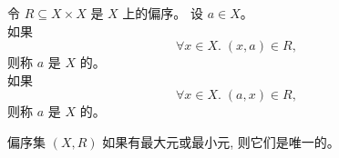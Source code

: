 \begin{frame}{}
  \begin{definition}
    令 $R \subseteq X \times X$ 是 $X$ 上的偏序。
    设 $a \in X$。\\[5pt]

    \pause
    如果
    \[
      \forall x \in X.\; (x, a) \in R,
    \]
    则称 $a$ 是 $X$ 的。\\[10pt]

    \pause
    如果
    \[
      \forall x \in X.\; (a, x) \in R,
    \]
    则称 $a$ 是 $X$ 的。
  \end{definition}

  \pause
  \begin{center}
  \end{center}
\end{frame}

\begin{frame}{}
  \begin{theorem}
    偏序集 $(X, R)$ 如果有最大元或最小元, 则它们是唯一的。
  \end{theorem}
\end{frame}

\begin{frame}{}
\end{frame}

\begin{frame}{}
\end{frame}

\begin{frame}{}
\end{frame}

\begin{frame}{}
\end{frame}
